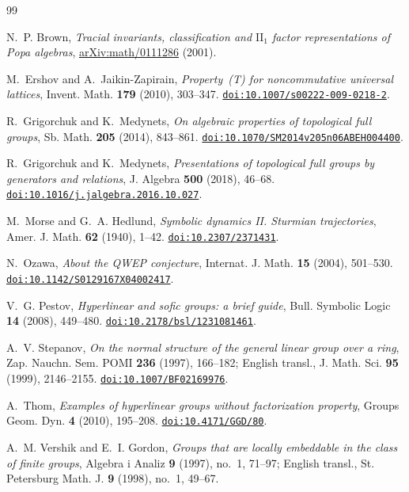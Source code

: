 \documentclass[11pt]{amsart}
\newcommand{\doi}[1]{\href{https://doi.org/#1}{\nolinkurl{doi:#1}}}
\begin{document}
\begin{thebibliography}{99}

N.~P. Brown, \emph{Tracial invariants, classification and
$\mathrm{II}_1$ factor representations of Popa algebras},
\href{https://arxiv.org/abs/math/0111286}{arXiv:math/0111286} (2001).

M.~Ershov and A.~Jaikin-Zapirain,
\emph{Property~\textup{(T)} for noncommutative universal lattices},
Invent. Math. \textbf{179} (2010), 303--347.
\doi{10.1007/s00222-009-0218-2}.

R.~Grigorchuk and K.~Medynets,
\emph{On algebraic properties of topological full groups},
Sb. Math. \textbf{205} (2014), 843--861.
\doi{10.1070/SM2014v205n06ABEH004400}.

R.~Grigorchuk and K.~Medynets,
\emph{Presentations of topological full groups by generators and
relations}, J. Algebra \textbf{500} (2018), 46--68.
\doi{10.1016/j.jalgebra.2016.10.027}.

M.~Morse and G.~A. Hedlund,
\emph{Symbolic dynamics II. Sturmian trajectories},
Amer. J. Math. \textbf{62} (1940), 1--42.
\doi{10.2307/2371431}.

N.~Ozawa, \emph{About the QWEP conjecture},
Internat. J. Math. \textbf{15} (2004), 501--530.
\doi{10.1142/S0129167X04002417}.

V.~G. Pestov, \emph{Hyperlinear and sofic groups: a brief guide},
Bull. Symbolic Logic \textbf{14} (2008), 449--480.
\doi{10.2178/bsl/1231081461}.

A.~V. Stepanov, \emph{On the normal structure of the general linear
group over a ring}, Zap. Nauchn. Sem. POMI \textbf{236} (1997), 166--182;
English transl., J. Math. Sci. \textbf{95} (1999), 2146--2155.
\doi{10.1007/BF02169976}.

A.~Thom, \emph{Examples of hyperlinear groups without factorization
property}, Groups Geom. Dyn. \textbf{4} (2010), 195--208.
\doi{10.4171/GGD/80}.

A.~M. Vershik and E.~I. Gordon,
\emph{Groups that are locally embeddable in the class of finite groups},
Algebra i Analiz \textbf{9} (1997), no.~1, 71--97; English transl.,
St. Petersburg Math. J. \textbf{9} (1998), no.~1, 49--67.

\end{thebibliography}
\end{document}
